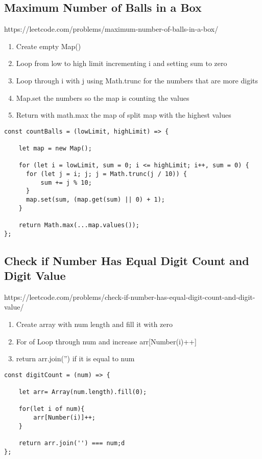 \documentclass[10pt]{article}
\begin{document}
\pagebreak %
\medskip   
\subsection{Maximum Number of Balls in a Box}
https://leetcode.com/problems/maximum-number-of-balls-in-a-box/

\begin{enumerate}
	\item Create empty Map()
	\item Loop from low to high limit incrementing i and setting sum to zero
	\item Loop through i with j using Math.trunc for the numbers that are more digits
	\item Map.set the numbers so the map is counting the values
	\item Return with math.max the map of split map with the highest values
\end{enumerate}

\begin{lstlisting}[title=Solution countBalls, captionpos=t]
const countBalls = (lowLimit, highLimit) => {
     
    let map = new Map();
       
    for (let i = lowLimit, sum = 0; i <= highLimit; i++, sum = 0) {
      for (let j = i; j; j = Math.trunc(j / 10)) {
          sum += j % 10;
      }
      map.set(sum, (map.get(sum) || 0) + 1);
    }
  
    return Math.max(...map.values());
};
\end{lstlisting}
\medskip %




\pagebreak %
\medskip   
\subsection{Check if Number Has Equal Digit Count and Digit Value}
https://leetcode.com/problems/check-if-number-has-equal-digit-count-and-digit-value/

\begin{enumerate}
	\item Create array with num length and fill it with zero 
	\item For of Loop through num and increase arr[Number(i)++]
	\item return arr.join('') if it is equal to num 
\end{enumerate}

\begin{lstlisting}[title=Solution digitCount, captionpos=t]
const digitCount = (num) => {
    
    let arr= Array(num.length).fill(0);

    for(let i of num){
        arr[Number(i)]++;
    }
    
    return arr.join('') === num;d
};
\end{lstlisting}
\medskip %
\end{document}
